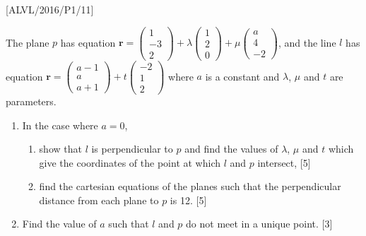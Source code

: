 \item {[}ALVL/2016/P1/11{]}

The plane $p$ has equation $\mathbf{r}=\left(\begin{array}{c}
1\\
-3\\
2
\end{array}\right)+\lambda\left(\begin{array}{c}
1\\
2\\
0
\end{array}\right)+\mu\left(\begin{array}{c}
a\\
4\\
-2
\end{array}\right)$, and the line $l$ has equation $\mathbf{r}=\left(\begin{array}{c}
a-1\\
a\\
a+1
\end{array}\right)+t\left(\begin{array}{c}
-2\\
1\\
2
\end{array}\right)$ where $a$ is a constant and $\lambda$, $\mu$ and $t$ are parameters. 
\begin{enumerate}
\item In the case where $a=0$, 
\begin{enumerate}
\item show that $l$ is perpendicular to $p$ and find the values of $\lambda$,
$\mu$ and $t$ which give the coordinates of the point at which $l$
and $p$ intersect, \hfill{}{[}5{]}
\item find the cartesian equations of the planes such that the perpendicular
distance from each plane to $p$ is 12. \hfill{} {[}5{]}
\end{enumerate}
\item Find the value of $a$ such that $l$ and $p$ do not meet in a unique
point. \hfill{}{[}3{]}
\end{enumerate}
